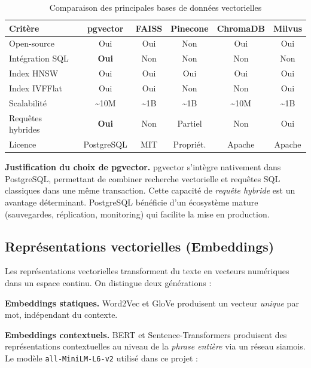 \documentclass[12pt,a4paper]{article}
\begin{document}
\begin{table}[H]
\centering
\caption{Comparaison des principales bases de donn\'{e}es vectorielles}
\label{tab:vectordb}
\begin{tabular}{@{}lccccc@{}}
\toprule
\textbf{Crit\`{e}re} & \textbf{pgvector} & \textbf{FAISS} & \textbf{Pinecone} & \textbf{ChromaDB} & \textbf{Milvus} \\
\midrule
Open-source        & Oui       & Oui    & Non       & Oui       & Oui \\
Int\'{e}gration SQL   & \textbf{Oui} & Non & Non    & Non       & Non \\
Index HNSW         & Oui       & Oui    & Oui       & Oui       & Oui \\
Index IVFFlat      & Oui       & Oui    & Non       & Non       & Oui \\
Scalabilit\'{e}       & \~{}10M   & \~{}1B & \~{}1B   & \~{}10M   & \~{}1B \\
Requ\^{e}tes hybrides & \textbf{Oui} & Non & Partiel & Non    & Oui \\
Licence            & PostgreSQL & MIT   & Propri\'{e}t. & Apache  & Apache \\
\bottomrule
\end{tabular}
\end{table}

\textbf{Justification du choix de pgvector.} pgvector s'int\`{e}gre nativement dans PostgreSQL, permettant de combiner recherche vectorielle et requ\^{e}tes SQL classiques dans une m\^{e}me transaction. Cette capacit\'{e} de \textit{requ\^{e}te hybride} est un avantage d\'{e}terminant. PostgreSQL b\'{e}n\'{e}ficie d'un \'{e}cosyst\`{e}me mature (sauvegardes, r\'{e}plication, monitoring) qui facilite la mise en production.

\subsection{Repr\'{e}sentations vectorielles (Embeddings)}

Les repr\'{e}sentations vectorielles transforment du texte en vecteurs num\'{e}riques dans un espace continu. On distingue deux g\'{e}n\'{e}rations :

\textbf{Embeddings statiques.} Word2Vec \cite{mikolov2013word2vec} et GloVe produisent un vecteur \textit{unique} par mot, ind\'{e}pendant du contexte.

\textbf{Embeddings contextuels.} BERT \cite{devlin2019bert} et Sentence-Transformers \cite{reimers2019sentence} produisent des repr\'{e}sentations contextuelles au niveau de la \textit{phrase enti\`{e}re} via un r\'{e}seau siamois. Le mod\`{e}le \texttt{all-MiniLM-L6-v2} utilis\'{e} dans ce projet :
\end{document}
